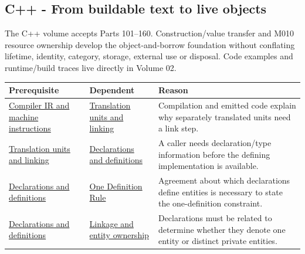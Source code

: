 \subsection{C++ - From buildable text to live objects}\label{appendix-4ad47bdd269a-c---from-buildable-text-to-live-objects}

The C++ volume accepts Parts 101--160. Construction/value transfer and M010 resource ownership develop the object-and-borrow foundation without conflating lifetime, identity, category, storage, external use or disposal. Code examples and runtime/build traces live directly in {Volume 02}.

{\def\LTcaptype{none} %
\begin{longtable}[]{@{}
  >{\raggedright\arraybackslash}p{}
  >{\raggedright\arraybackslash}p{}
  >{\raggedright\arraybackslash}p{}@{}}
\toprule\noalign{}
\begin{minipage}[b]{\linewidth}\raggedright
Prerequisite
\end{minipage} & \begin{minipage}[b]{\linewidth}\raggedright
Dependent
\end{minipage} & \begin{minipage}[b]{\linewidth}\raggedright
Reason
\end{minipage} \\
\midrule\noalign{}
\endhead
\bottomrule\noalign{}
\endlastfoot
\hyperref[appendix-942ad41afb30]{Compiler IR and machine instructions} & \hyperref[appendix-806686359e1b]{Translation units and linking} & Compilation and emitted code explain why separately translated units need a link step. \\
\hyperref[appendix-806686359e1b]{Translation units and linking} & \hyperref[appendix-2e4d494c2d94]{Declarations and definitions} & A caller needs declaration/type information before the defining implementation is available. \\
\hyperref[appendix-2e4d494c2d94]{Declarations and definitions} & \hyperref[appendix-49d27bc9d9a5]{One Definition Rule} & Agreement about which declarations define entities is necessary to state the one-definition constraint. \\
\hyperref[appendix-2e4d494c2d94]{Declarations and definitions} & \hyperref[appendix-74a0ec818c18]{Linkage and entity ownership} & Declarations must be related to determine whether they denote one entity or distinct private entities. \\

\end{longtable}}
